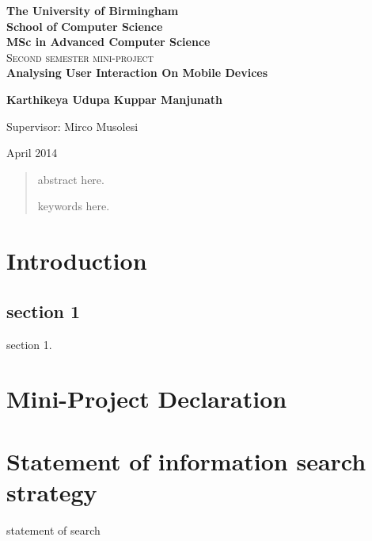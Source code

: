 \documentclass[12pt]{report}
\begin{document}
\begin{titlepage}
\begin{center}

\textbf{\LARGE The University of Birmingham}\\[0.35cm]
\textbf{\LARGE School of Computer Science}\\[0.35cm]
\textbf{\LARGE MSc in Advanced Computer Science}\\[2.5cm]

\textsc{\Large Second semester mini-project}\\[2.5cm]


{ \huge \bfseries  Analysing User Interaction On Mobile Devices \\[1cm] }

{\large \textbf{Karthikeya Udupa Kuppar Manjunath}\\[1cm]}

\large{Supervisor: Mirco Musolesi}


\vfill

{\large April 2014}

\end{center}
\end{titlepage}

\begin{abstract}

abstract here.
\linebreak\linebreak\linebreak\linebreak
\begin{center}
\begin{keywords}
keywords here.
\end{keywords}
\end{center}
\end{abstract}


\tableofcontents
\listoffigures
\listoftables
\newpage

\chapter{Introduction}
\noindent

\noindent

\section{section 1}
section 1.



\appendix
\chapter{Mini-Project Declaration}


\chapter{Statement of information search strategy}

statement of search
\end{document}
